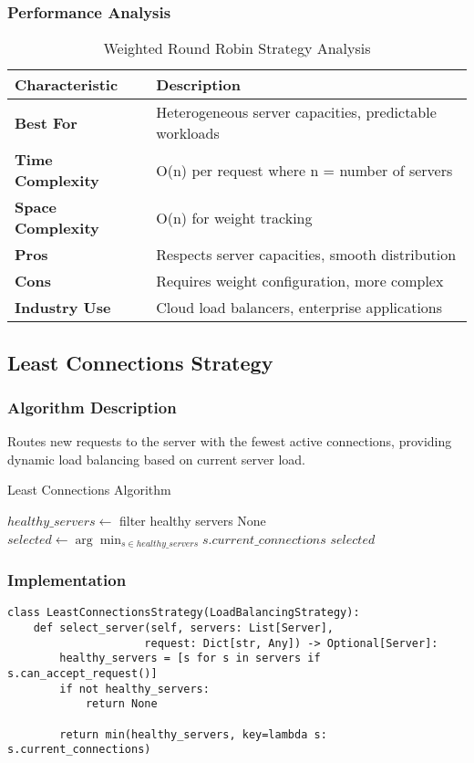 \documentclass[12pt,a4paper]{article}
\begin{document}
\subsubsection{Performance Analysis}
\begin{table}[H]
\centering
\begin{tabular}{@{}lp{8cm}@{}}
\toprule
\textbf{Characteristic} & \textbf{Description} \\
\midrule
\textbf{Best For} & Heterogeneous server capacities, predictable workloads \\
\textbf{Time Complexity} & O(n) per request where n = number of servers \\
\textbf{Space Complexity} & O(n) for weight tracking \\
\textbf{Pros} & Respects server capacities, smooth distribution \\
\textbf{Cons} & Requires weight configuration, more complex \\
\textbf{Industry Use} & Cloud load balancers, enterprise applications \\
\bottomrule
\end{tabular}
\caption{Weighted Round Robin Strategy Analysis}
\end{table}

\subsection{Least Connections Strategy}
\label{subsec:leastconn}

\subsubsection{Algorithm Description}
Routes new requests to the server with the fewest active connections, providing dynamic load balancing based on current server load.

\begin{algorithm}
\caption{Least Connections Algorithm}
\begin{algorithmic}[1]
    \STATE $healthy\_servers \leftarrow$ filter healthy servers
        \RETURN None
    \ENDIF
    \STATE $selected \leftarrow \arg\min_{s \in healthy\_servers} s.current\_connections$
    \RETURN $selected$
\ENDWHILE
\end{algorithmic}
\end{algorithm}

\subsubsection{Implementation}
\begin{lstlisting}[caption=Least Connections Strategy]
class LeastConnectionsStrategy(LoadBalancingStrategy):
    def select_server(self, servers: List[Server], 
                     request: Dict[str, Any]) -> Optional[Server]:
        healthy_servers = [s for s in servers if s.can_accept_request()]
        if not healthy_servers:
            return None
        
        return min(healthy_servers, key=lambda s: s.current_connections)
\end{lstlisting}
\end{document}
